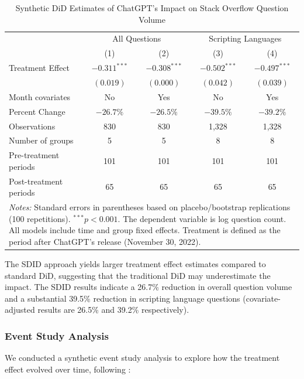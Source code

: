 \begin{table}[H]
    \centering
    \caption{Synthetic DiD Estimates of ChatGPT's Impact on Stack Overflow Question Volume}
    \label{tab:sdid_results}
    \begin{tabular}{lcccc}
        \toprule
            & \multicolumn{2}{c}{All Questions} & \multicolumn{2}{c}{Scripting Languages} \\
            \cmidrule(lr){2-3} \cmidrule(lr){4-5}
            & (1) & (2) & (3) & (4) \\
        \midrule
            Treatment Effect & $-0.311^{***}$ & $-0.308^{***}$ & $-0.502^{***}$ & $-0.497^{***}$ \\
            & $(0.019)$ & $(0.000)$ & $(0.042)$ & $(0.039)$ \\
        \midrule
            Month covariates & No & Yes & No & Yes \\
            Percent Change & $-26.7\%$ & $-26.5\%$ & $-39.5\%$ & $-39.2\%$ \\
        \midrule
            Observations & 830 & 830 & 1,328 & 1,328 \\
            Number of groups & 5 & 5 & 8 & 8 \\
            Pre-treatment periods & 101 & 101 & 101 & 101 \\
            Post-treatment periods & 65 & 65 & 65 & 65 \\
        \bottomrule
            \multicolumn{5}{p{0.95\linewidth}}{\footnotesize \textit{Notes:} Standard errors in parentheses based on placebo/bootstrap replications (100 repetitions). $^{***}p<0.001$. The dependent variable is log question count. All models include time and group fixed effects. Treatment is defined as the period after ChatGPT's release (November 30, 2022).} \\
    \end{tabular}
\end{table}

The SDID approach yields larger treatment effect estimates compared to standard DiD, suggesting that the traditional DiD may underestimate the impact. The SDID results indicate a 26.7\% reduction in overall question volume and a substantial 39.5\% reduction in scripting language questions (covariate-adjusted results are 26.5\% and 39.2\% respectively).


\subsubsection{Event Study Analysis}
We conducted a synthetic event study analysis to explore how the treatment effect evolved over time, following \textcite{ciccia_short_2024}:


